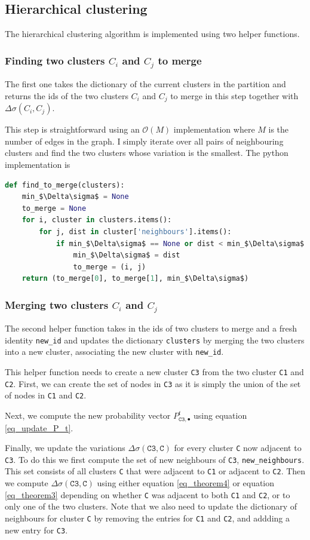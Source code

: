 \documentclass[12pt]{article}
\theoremstyle{definition}
\begin{document}
\subsection{Hierarchical clustering}
The hierarchical clustering algorithm is implemented using two helper functions. 
\subsubsection{Finding two clusters $C_i$ and $C_j$ to merge}
The first one takes the dictionary of the current clusters in the partition and returns the ids of the two clusters $C_i$ and $C_j$ to merge in this step together with $\Delta\sigma(C_i,C_j)$. 

This step is straightforward using an $\mathcal{O}(M)$ implementation where $M$ is the number of edges in the graph. I simply iterate over all pairs of neighbouring clusters and find the two clusters whose variation is the smallest. The python implementation is
\begin{lstlisting}[language=Python, mathescape]
def find_to_merge(clusters):
    min_$\Delta\sigma$ = None
    to_merge = None
    for i, cluster in clusters.items():
        for j, dist in cluster['neighbours'].items():
            if min_$\Delta\sigma$ == None or dist < min_$\Delta\sigma$:
                min_$\Delta\sigma$ = dist
                to_merge = (i, j)
    return (to_merge[0], to_merge[1], min_$\Delta\sigma$)
\end{lstlisting}


\subsubsection{Merging two clusters $C_i$ and $C_j$}
The second helper function takes in the ids of two clusters to merge and a fresh identity \texttt{new\_id} and updates the dictionary \texttt{clusters} by merging the two clusters into a new cluster, associating the new cluster with \texttt{new\_id}.

This helper function needs to create a new cluster \texttt{C3} from the two cluster \texttt{C1} and \texttt{C2}. First, we can create the set of nodes in \texttt{C3} as it is simply the union of the set of nodes in \texttt{C1} and \texttt{C2}.

Next, we compute the new probability vector $P_{\texttt{C3}, \bullet}^t$ using equation \ref{eq_update_P_t}.

Finally, we update the variations $\Delta\sigma(\texttt{C3}, \texttt{C})$ for every cluster \texttt{C} now adjacent to \texttt{C3}. To do this we first compute the set of new neighbours of \texttt{C3}, \texttt{new\_neighbours}. This set consists of all clusters \texttt{C} that were adjacent to \texttt{C1} or adjacent to \texttt{C2}. Then we compute $\Delta\sigma(\texttt{C3}, \texttt{C})$ using either equation \ref{eq_theorem4} or equation \ref{eq_theorem3} depending on whether \texttt{C} was adjacent to both \texttt{C1} and \texttt{C2}, or to only one of the two clusters. Note that we also need to update the dictionary of neighbours for cluster \texttt{C} by removing the entries for \texttt{C1} and \texttt{C2}, and addding a new entry for \texttt{C3}. 
\end{document}
